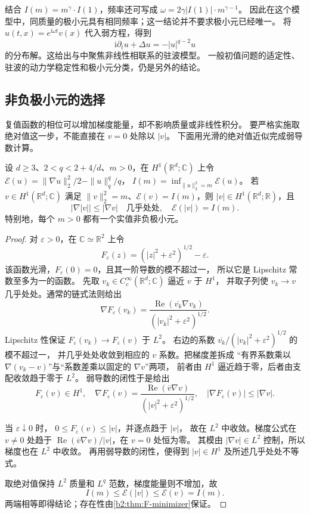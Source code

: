 结合 \(I(m)=m^\gamma\cdot I(1)\)，频率还可写成
\(\omega=2\gamma|I(1)|\cdot m^{\gamma-1}\)。
因此在这个模型中，同质量的极小元具有相同频率；这一结论并不要求极小元已经唯一。
将 \(u(t,x)=e^{\mathrm i\omega t}v(x)\) 代入弱方程，得到
\[
 \mathrm i\partial_tu+\Delta u=-|u|^{q-2}u
\]
的分布解。这给出与中聚焦非线性相联系的驻波模型。
一般初值问题的适定性、驻波的动力学稳定性和极小元分类，仍是另外的结论。

\subsection{非负极小元的选择}
\label{b2:subsec:F-nonnegative-minimizer}

复值函数的相位可以增加梯度能量，却不影响质量或非线性积分。
要严格实施取绝对值这一步，不能直接在 \(v=0\) 处除以 \(|v|\)。
下面用光滑的绝对值近似完成弱导数计算。

\begin{proposition}[绝对值变换与非负极小元]
\label{b2:prop:F-nonnegative-minimizer}
设 \(d\ge3\)、\(2<q<2+4/d\)、\(m>0\)，在
\(H^1(\mathbb R^d;\mathbb C)\) 上令
\(\mathcal E(u)=\|\nabla u\|_2^2/2-\|u\|_q^q/q\)，
\(I(m)=\inf_{\|u\|_2^2=m}\mathcal E(u)\)。
若 \(v\in H^1(\mathbb R^d;\mathbb C)\) 满足
\(\|v\|_2^2=m\)、\(\mathcal E(v)=I(m)\)，则 \(|v|\in H^1(\mathbb R^d;\mathbb R)\)，且
\[
 |\nabla|v||\le|\nabla v|\quad\text{几乎处处},
 \quad\mathcal E(|v|)=I(m).
\]
特别地，每个 \(m>0\) 都有一个实值非负极小元。
\end{proposition}
\begin{proof}
对 \(\varepsilon>0\)，在 \(\mathbb C\simeq\mathbb R^2\) 上令
\[
 F_\varepsilon(z)=(|z|^2+\varepsilon^2)^{1/2}-\varepsilon.
\]
该函数光滑，\(F_\varepsilon(0)=0\)，且其一阶导数的模不超过一，
所以它是 Lipschitz 常数至多为一的函数。
先取 \(v_k\in C_c^\infty(\mathbb R^d;\mathbb C)\) 逼近 \(v\) 于 \(H^1\)，
并取子列使 \(v_k\to v\) 几乎处处。通常的链式法则给出
\[
 \nabla F_\varepsilon(v_k)=
 \frac{\operatorname{Re}(\overline{v_k}\nabla v_k)}
      {( |v_k|^2+\varepsilon^2)^{1/2}}.
\]
Lipschitz 性保证 \(F_\varepsilon(v_k)\to F_\varepsilon(v)\) 于 \(L^2\)。
右边的系数 \(\overline{v_k}/(|v_k|^2+\varepsilon^2)^{1/2}\) 的模不超过一，
并几乎处处收敛到相应的 \(v\) 系数。把梯度差拆成
“有界系数乘以 \(\nabla(v_k-v)\)”与“系数差乘以固定的 \(\nabla v\)”两项，
前者由 \(H^1\) 逼近趋于零，后者由支配收敛趋于零于 \(L^2\)。
弱导数的闭性于是给出
\[
 F_\varepsilon(v)\in H^1,\quad
 \nabla F_\varepsilon(v)=
 \frac{\operatorname{Re}(\overline v\nabla v)}
      {( |v|^2+\varepsilon^2)^{1/2}},\quad
 |\nabla F_\varepsilon(v)|\le|\nabla v|.
\]

当 \(\varepsilon\downarrow0\) 时，
\(0\le F_\varepsilon(v)\le|v|\)，并逐点趋于 \(|v|\)，
故在 \(L^2\) 中收敛。梯度公式在 \(v\ne0\) 处趋于
\(\operatorname{Re}(\overline v\nabla v)/|v|\)，在 \(v=0\) 处恒为零。
其模由 \(|\nabla v|\in L^2\) 控制，所以梯度也在 \(L^2\) 中收敛。
再用弱导数的闭性，便得到 \(|v|\in H^1\) 及所述几乎处处不等式。

取绝对值保持 \(L^2\) 质量和 \(L^q\) 范数，梯度能量则不增加，故
\[
 I(m)\le\mathcal E(|v|)\le\mathcal E(v)=I(m).
\]
两端相等即得结论；存在性由\cref{b2:thm:F-minimizer}保证。
\end{proof}

